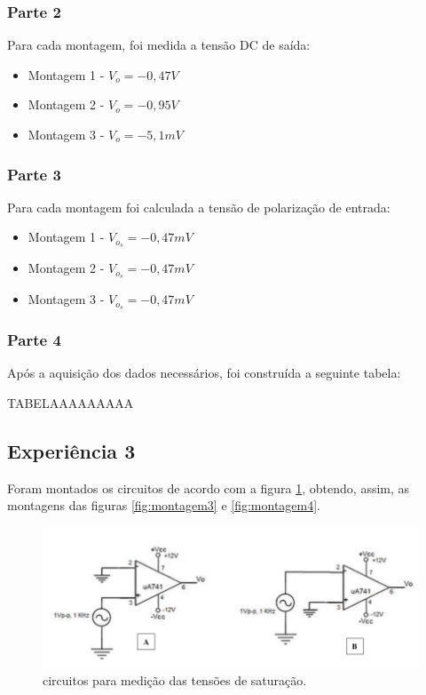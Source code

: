 \documentclass{abntex2}
\begin{document}
\subsubsection{Parte 2}
Para cada montagem, foi medida a tensão DC de saída:
\begin{itemize}
  \item Montagem 1 - $V_o = -0,47V$
  \item Montagem 2 - $V_o = -0,95V$
  \item Montagem 3 - $V_o = -5,1mV$
\end{itemize}
\subsubsection{Parte 3}
Para cada montagem foi calculada a tensão de polarização de entrada:

\begin{itemize}
  \item Montagem 1 - $V_o_s = -0,47mV$
  \item Montagem 2 - $V_o_s = -0,47mV$
  \item Montagem 3 - $V_o_s = -0,47mV$
\end{itemize}

\subsubsection{Parte 4}
Após a aquisição dos dados necessários, foi construída a seguinte tabela:

TABELAAAAAAAAA

\subsection{Experiência 3}

Foram montados os circuitos de acordo com a figura \ref{fig:circuito3}, obtendo, assim, as montagens das figuras \ref{fig:montagem3} e \ref{fig:montagem4}.

\begin{figure}[h]
  \centering
  \includegraphics[scale = 0.5]{exp3.png}
  \caption{circuitos para medição das tensões de saturação.}
  \label{fig:circuito3}
\end{figure}
\end{document}

